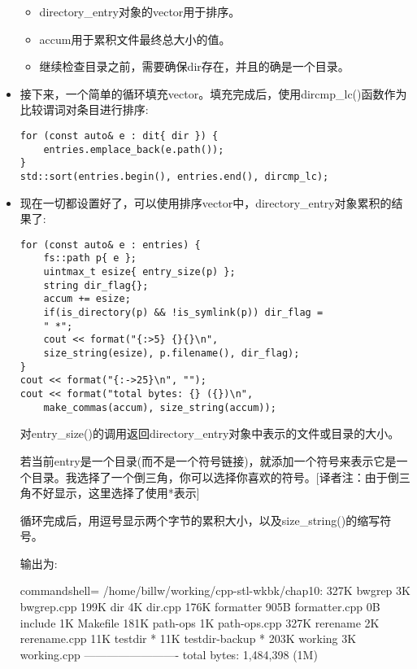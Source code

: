 \begin{itemize}
\begin{itemize}
\item 
directory\_entry对象的vector用于排序。

\item 
accum用于累积文件最终总大小的值。

\item 
继续检查目录之前，需要确保dir存在，并且的确是一个目录。
\end{itemize}

\item 
接下来，一个简单的循环填充vector。填充完成后，使用dircmp\_lc()函数作为比较谓词对条目进行排序:

\begin{lstlisting}[style=styleCXX]
for (const auto& e : dit{ dir }) {
	entries.emplace_back(e.path());
}
std::sort(entries.begin(), entries.end(), dircmp_lc);
\end{lstlisting}

\item 
现在一切都设置好了，可以使用排序vector中，directory\_entry对象累积的结果了:

\begin{lstlisting}[style=styleCXX]
for (const auto& e : entries) {
	fs::path p{ e };
	uintmax_t esize{ entry_size(p) };
	string dir_flag{};
	accum += esize;
	if(is_directory(p) && !is_symlink(p)) dir_flag =
	" *";
	cout << format("{:>5} {}{}\n",
	size_string(esize), p.filename(), dir_flag);
}
cout << format("{:->25}\n", "");
cout << format("total bytes: {} ({})\n",
	make_commas(accum), size_string(accum));
\end{lstlisting}

对entry\_size()的调用返回directory\_entry对象中表示的文件或目录的大小。

若当前entry是一个目录(而不是一个符号链接)，就添加一个符号来表示它是一个目录。我选择了一个倒三角，你可以选择你喜欢的符号。[译者注：由于倒三角不好显示，这里选择了使用*表示]

循环完成后，用逗号显示两个字节的累积大小，以及size\_string()的缩写符号。

输出为:

\begin{tcblisting}{commandshell={}}
/home/billw/working/cpp-stl-wkbk/chap10:
327K bwgrep
  3K bwgrep.cpp
199K dir
  4K dir.cpp
176K formatter
905B formatter.cpp
  0B include
  1K Makefile
181K path-ops
  1K path-ops.cpp
327K rerename
  2K rerename.cpp
 11K testdir *
 11K testdir-backup *
203K working
  3K working.cpp
-------------------------
total bytes: 1,484,398 (1M)
\end{tcblisting}

\end{itemize}

